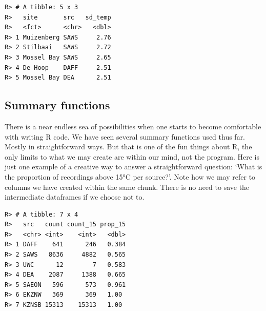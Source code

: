 \documentclass[]{book}
\newenvironment{Shaded}{\begin{snugshade}}{\end{snugshade}}
\newcommand{\KeywordTok}[1]{\textcolor[rgb]{0.13,0.29,0.53}{\textbf{#1}}}
\newcommand{\DataTypeTok}[1]{\textcolor[rgb]{0.13,0.29,0.53}{#1}}
\newcommand{\DecValTok}[1]{\textcolor[rgb]{0.00,0.00,0.81}{#1}}
\newcommand{\StringTok}[1]{\textcolor[rgb]{0.31,0.60,0.02}{#1}}
\newcommand{\OperatorTok}[1]{\textcolor[rgb]{0.81,0.36,0.00}{\textbf{#1}}}
\newcommand{\NormalTok}[1]{#1}
\theoremstyle{definition}
\theoremstyle{definition}
\theoremstyle{definition}
\theoremstyle{remark}
\begin{document}
\begin{verbatim}
R> # A tibble: 5 x 3
R>   site       src   sd_temp
R>   <fct>      <chr>   <dbl>
R> 1 Muizenberg SAWS     2.76
R> 2 Stilbaai   SAWS     2.72
R> 3 Mossel Bay SAWS     2.65
R> 4 De Hoop    DAFF     2.51
R> 5 Mossel Bay DEA      2.51
\end{verbatim}

\subsection{Summary functions}\label{summary-functions}

There is a near endless sea of possibilities when one starts to become
comfortable with writing R code. We have seen several summary functions
used thus far. Mostly in straightforward ways. But that is one of the
fun things about R, the only limits to what we may create are within our
mind, not the program. Here is just one example of a creative way to
answer a straightforward question: `What is the proportion of recordings
above 15°C per source?'. Note how we may refer to columns we have
created within the same chunk. There is no need to save the intermediate
dataframes if we choose not to.

\begin{Shaded}
\end{Shaded}

\begin{verbatim}
R> # A tibble: 7 x 4
R>   src   count count_15 prop_15
R>   <chr> <int>    <int>   <dbl>
R> 1 DAFF    641      246   0.384
R> 2 SAWS   8636     4882   0.565
R> 3 UWC      12        7   0.583
R> 4 DEA    2087     1388   0.665
R> 5 SAEON   596      573   0.961
R> 6 EKZNW   369      369   1.00 
R> 7 KZNSB 15313    15313   1.00
\end{verbatim}
\end{document}
